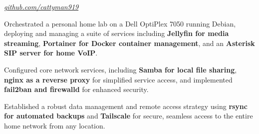 \documentclass[../main.tex]{subfiles}
\begin{document}
\vspace{0.2 cm}

\begin{twocolentry}{
    \small
    \textit{\href{https://github.com/cattyman919/}{github.com/cattyman919}}
}
\end{twocolentry}

\vspace{0.10 cm}
\begin{onecolentry}
\begin{highlights}
    \item Orchestrated a personal home lab on a Dell OptiPlex 7050 running Debian, deploying and managing a suite of services including \textbf{Jellyfin for media streaming}, \textbf{Portainer for Docker container management}, and an \textbf{Asterisk SIP server for home VoIP}.
    \item Configured core network services, including \textbf{Samba for local file sharing}, \textbf{nginx as a reverse proxy} for simplified service access, and implemented \textbf{fail2ban and firewalld} for enhanced security.
    \item Established a robust data management and remote access strategy using \textbf{rsync for automated backups} and \textbf{Tailscale} for secure, seamless access to the entire home network from any location.
\end{highlights}
\end{onecolentry}
\end{document}
